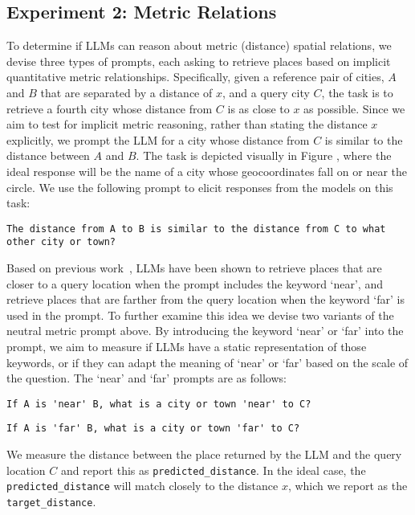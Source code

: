 \subsection{Experiment 2: Metric Relations}
To determine if LLMs can reason about metric (distance) spatial relations, we devise three types of prompts, each asking to retrieve places based on implicit quantitative metric relationships.
%
Specifically, given a reference pair of cities, $A$ and $B$ that are separated by a distance of $x$, and a query city $C$, the task is to retrieve a fourth city whose distance from $C$ is as close to $x$ as possible.
Since we aim to test for implicit metric reasoning, rather than stating the distance $x$ explicitly, we prompt the LLM for a city whose distance from $C$ is similar to the distance between $A$ and $B$.
The task is depicted visually in Figure , where the ideal response will be the name of a city whose geocoordinates fall on or near the circle.
We use the following prompt to elicit responses from the models on this task:

\begin{lstlisting}[title=Prompt 3: Neutral Metric Prompt]
    The distance from A to B is similar to the distance from C to what other city or town?
\end{lstlisting}

\noindent Based on previous work~\cite{Bhandari2023}, LLMs have been shown to retrieve places that are closer to a query location when the prompt includes the keyword `near', and retrieve places that are farther from the query location when the keyword `far' is used in the prompt.
To further examine this idea we devise two variants of the neutral metric prompt above.
By introducing the keyword `near' or `far' into the prompt, we aim to measure if LLMs have a static representation of those keywords, or if they can adapt the meaning of `near' or `far' based on the scale of the question.
The `near' and `far' prompts are as follows:

\begin{lstlisting}[title=Prompt 4: `Near' Metric Prompt]
    If A is 'near' B, what is a city or town 'near' to C?
\end{lstlisting}

\begin{lstlisting}[title=Prompt 5: `Far' Metric Prompt]
    If A is 'far' B, what is a city or town 'far' to C?
\end{lstlisting}

\noindent We measure the distance between the place returned by the LLM and the query location $C$ and report this as \texttt{predicted{\_}distance}.
In the ideal case, the \texttt{predicted{\_}distance} will match closely to the distance $x$, which we report as the \texttt{target{\_}distance}.




